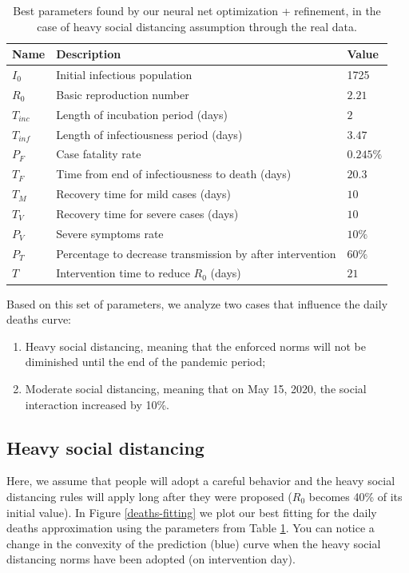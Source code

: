 \documentclass[11pt]{article}
\begin{document}
\begin{table}[H]
  \caption{Best parameters found by our neural net optimization + refinement, in the case of heavy social distancing assumption through the real data.}
  \label{optimal-params}
  \centering
  \begin{tabular}{lll}
    \toprule
    Name & Description & Value \\
    \midrule
    $I_0$ & Initial infectious population & 1725 \\
    $R_0$ & Basic reproduction number & $2.21$ \\
    $T_{inc}$ & Length of incubation period (days) & $2$ \\
    $T_{inf}$ & Length of infectiousness period (days) & $3.47$ \\
    $P_F$ & Case fatality rate & $0.245\%$ \\
    $T_F$ & Time from end of infectiousness to death (days) & $20.3$ \\
    $T_M$ & Recovery time for mild cases (days) & $10$ \\
    $T_V$ & Recovery time for severe cases (days) & $10$ \\
    $P_V$ & Severe symptoms rate & $10\%$ \\
    $P_T$ & Percentage to decrease transmission by after intervention & $60\%$ \\
    $T$ & Intervention time to reduce $R_0$ (days) & $21$ \\
    \bottomrule
  \end{tabular}
\end{table}

Based on this set of parameters, we analyze two cases that influence the daily deaths curve:
\begin{enumerate}
    \item Heavy social distancing, meaning that the enforced norms will not be diminished until the end of the pandemic period;
    \item Moderate social distancing, meaning that on May 15, 2020, the social interaction increased by 10\%.
\end{enumerate}


\subsection{Heavy social distancing}

Here, we assume that people will adopt a careful behavior and the heavy social distancing rules will apply long after they were proposed ($R_0$ becomes 40\% of its initial value). In Figure \ref{deaths-fitting} we plot our best fitting for the daily deaths approximation using the parameters from Table \ref{optimal-params}. You can notice a change in the convexity of the prediction (blue) curve when the heavy social distancing norms have been adopted (on intervention day).
\end{document}
